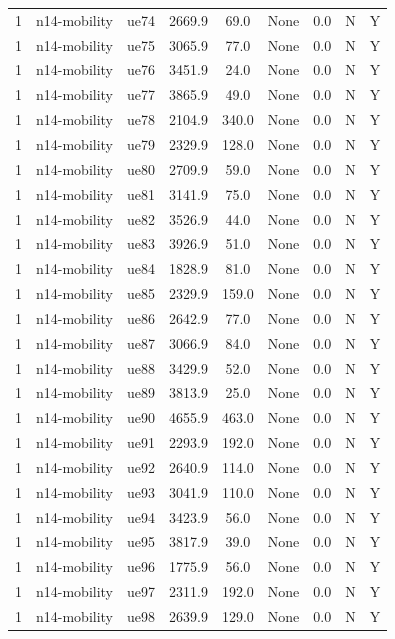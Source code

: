 \begin{table}[ht]
\begin{tabular}{|c|c|c|c|c|c|c|c|c|}
1 & n14-mobility & ue74 & 2669.9 & 69.0 & None & 0.0 & N & Y \\
1 & n14-mobility & ue75 & 3065.9 & 77.0 & None & 0.0 & N & Y \\
1 & n14-mobility & ue76 & 3451.9 & 24.0 & None & 0.0 & N & Y \\
1 & n14-mobility & ue77 & 3865.9 & 49.0 & None & 0.0 & N & Y \\
1 & n14-mobility & ue78 & 2104.9 & 340.0 & None & 0.0 & N & Y \\
1 & n14-mobility & ue79 & 2329.9 & 128.0 & None & 0.0 & N & Y \\
1 & n14-mobility & ue80 & 2709.9 & 59.0 & None & 0.0 & N & Y \\
1 & n14-mobility & ue81 & 3141.9 & 75.0 & None & 0.0 & N & Y \\
1 & n14-mobility & ue82 & 3526.9 & 44.0 & None & 0.0 & N & Y \\
1 & n14-mobility & ue83 & 3926.9 & 51.0 & None & 0.0 & N & Y \\
1 & n14-mobility & ue84 & 1828.9 & 81.0 & None & 0.0 & N & Y \\
1 & n14-mobility & ue85 & 2329.9 & 159.0 & None & 0.0 & N & Y \\
1 & n14-mobility & ue86 & 2642.9 & 77.0 & None & 0.0 & N & Y \\
1 & n14-mobility & ue87 & 3066.9 & 84.0 & None & 0.0 & N & Y \\
1 & n14-mobility & ue88 & 3429.9 & 52.0 & None & 0.0 & N & Y \\
1 & n14-mobility & ue89 & 3813.9 & 25.0 & None & 0.0 & N & Y \\
1 & n14-mobility & ue90 & 4655.9 & 463.0 & None & 0.0 & N & Y \\
1 & n14-mobility & ue91 & 2293.9 & 192.0 & None & 0.0 & N & Y \\
1 & n14-mobility & ue92 & 2640.9 & 114.0 & None & 0.0 & N & Y \\
1 & n14-mobility & ue93 & 3041.9 & 110.0 & None & 0.0 & N & Y \\
1 & n14-mobility & ue94 & 3423.9 & 56.0 & None & 0.0 & N & Y \\
1 & n14-mobility & ue95 & 3817.9 & 39.0 & None & 0.0 & N & Y \\
1 & n14-mobility & ue96 & 1775.9 & 56.0 & None & 0.0 & N & Y \\
1 & n14-mobility & ue97 & 2311.9 & 192.0 & None & 0.0 & N & Y \\
1 & n14-mobility & ue98 & 2639.9 & 129.0 & None & 0.0 & N & Y \\

\end{tabular}
\end{table}
